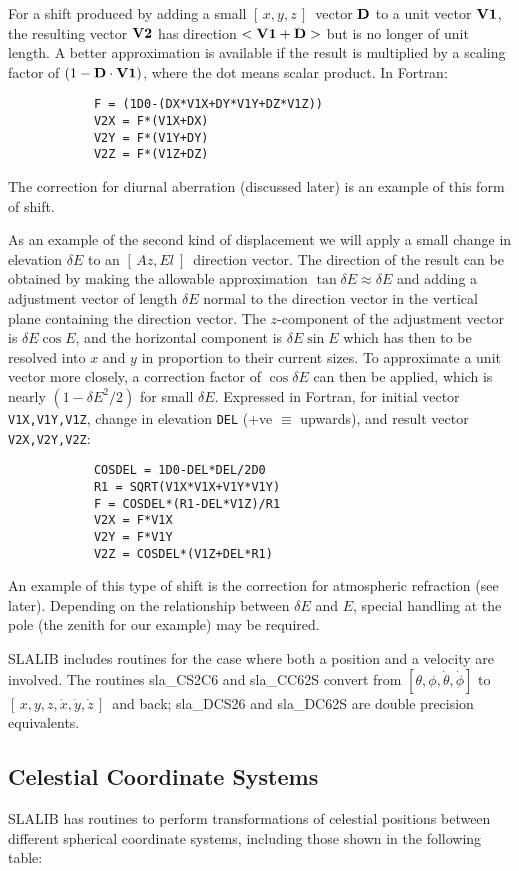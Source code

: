 \documentclass[11pt,twoside]{article}
\newcommand{\azel}      {$[\,Az,El~]$}
\newcommand{\xyz}       {$[\,x,y,z\,]$}
\newcommand{\xyzxyzd}   {$[\,x,y,z,\dot{x},\dot{y},\dot{z}\,]$}
\begin{document}
For a shift produced by adding a small \xyz\ vector ${\bf D}$ to a
unit vector ${\bf V1}$, the resulting vector ${\bf V2}$ has direction
$<{\bf V1}+{\bf D}>$ but is no longer of unit length.  A better approximation
is available if the result is multiplied by a scaling factor of
$(1-{\bf D}\cdot{\bf V1})$, where the dot
means scalar product.  In Fortran:
\goodbreak
\begin{verbatim}
            F = (1D0-(DX*V1X+DY*V1Y+DZ*V1Z))
            V2X = F*(V1X+DX)
            V2Y = F*(V1Y+DY)
            V2Z = F*(V1Z+DZ)
\end{verbatim}
\goodbreak
\noindent
The correction for diurnal aberration (discussed later) is
an example of this form of shift.

As an example of the second kind of displacement
we will apply a small change in elevation $\delta E$ to an
\azel\ direction vector.  The direction of the
result can be obtained by making the allowable approximation
${\tan \delta E\approx\delta E}$ and adding a adjustment
vector of length $\delta E$ normal
to the direction vector in the vertical plane containing the direction
vector.  The $z$-component of the adjustment vector is
$\delta E \cos E$,
and the horizontal component is
$\delta E \sin E$ which has then to be
resolved into $x$ and $y$ in proportion to their current sizes. To
approximate a unit vector more closely, a correction factor of
$\cos \delta E$ can then be applied, which is nearly
$(1-\delta E^2 /2)$ for
small $\delta E$.  Expressed in Fortran, for initial vector
{\tt V1X,V1Y,V1Z}, change in elevation {\tt DEL}
(+ve $\equiv$ upwards), and result
vector {\tt V2X,V2Y,V2Z}:
\goodbreak
\begin{verbatim}
            COSDEL = 1D0-DEL*DEL/2D0
            R1 = SQRT(V1X*V1X+V1Y*V1Y)
            F = COSDEL*(R1-DEL*V1Z)/R1
            V2X = F*V1X
            V2Y = F*V1Y
            V2Z = COSDEL*(V1Z+DEL*R1)
\end{verbatim}
\goodbreak
An example of this type of shift is the correction for atmospheric
refraction (see later).
Depending on the relationship between $\delta E$ and $E$, special
handling at the pole (the zenith for our example) may be required.

SLALIB includes routines for the case where both a position
and a velocity are involved.  The routines
sla\_CS2C6
and
sla\_CC62S
convert from $[\theta,\phi,\dot{\theta},\dot{\phi}]$
to \xyzxyzd\ and back;
sla\_DCS26
and
sla\_DC62S
are double precision equivalents.

\subsection {Celestial Coordinate Systems}
SLALIB has routines to perform transformations
of celestial positions between different spherical
coordinate systems, including those shown in the following table:
\end{document}
